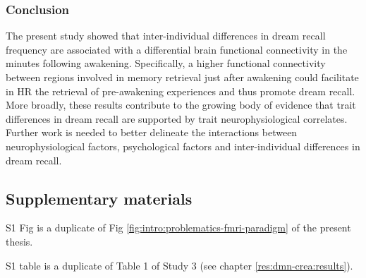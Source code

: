 \subsubsection{Conclusion}
The present study showed that inter-individual differences in dream recall frequency are associated with a differential brain functional connectivity in the minutes following awakening. Specifically, a higher functional connectivity between regions involved in memory retrieval just after awakening could facilitate in HR the retrieval of pre-awakening experiences and thus promote dream recall. More broadly, these results contribute to the growing body of evidence that trait differences in dream recall are supported by trait neurophysiological correlates. Further work is needed to better delineate the interactions between neurophysiological factors, psychological factors and inter-individual differences in dream recall.

%

\FloatBarrier

\subsection*{Supplementary materials}

S1 Fig is a duplicate of Fig \ref{fig:intro:problematics-fmri-paradigm} of the present thesis.

S1 table is a duplicate of Table 1 of Study 3 (see chapter \ref{res:dmn-crea:results}).

\vspace*{1cm}

